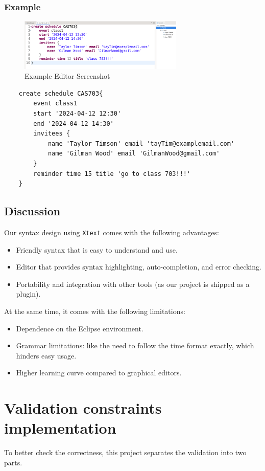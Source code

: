 \documentclass[12pt, letterpaper, twoside]{article}
\begin{document}
\subsubsection{Example}
\begin{figure}[H]
    \centering
    \includegraphics[width=0.7\textwidth]{editor_example.png}
    \caption{Example Editor Screenshot}
    \label{fig:class-diagram}
\end{figure}

\begin{verbatim}
    create schedule CAS703{
        event class1 
        start '2024-04-12 12:30'
        end '2024-04-12 14:30'
        invitees {
            name 'Taylor Timson' email 'tayTim@examplemail.com'
            name 'Gilman Wood' email 'GilmanWood@gmail.com'
        }
        reminder time 15 title 'go to class 703!!!'
    }
\end{verbatim}

\subsection{Discussion}
Our syntax design using \texttt{Xtext} comes with the following advantages:
\begin{itemize}
    \item Friendly syntax that is easy to understand and use.
    \item Editor that provides syntax highlighting, auto-completion, and error checking.
    \item Portability and integration with other tools (as our project is shipped as a plugin). 
\end{itemize}
At the same time, it comes with the following limitations:
\begin{itemize}
    \item Dependence on the Eclipse environment.
    \item Grammar limitations: like the need to follow the time format exactly, which hinders easy usage.
    \item Higher learning curve compared to graphical editors.
\end{itemize}


\newpage
\section{Validation constraints implementation}
To better check the correctness, this project separates the validation into two parts.
\end{document}
